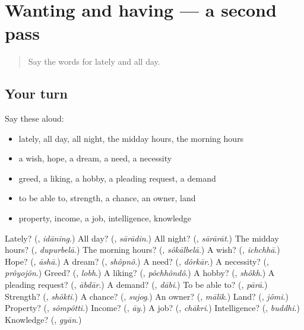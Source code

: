 \section[(dialogue)]{Wanting and having — a second pass}

\label{lesson:BN-R99-second-pass-wanting-and-having}



\begin{quote}
Say the words for lately and all day.
\end{quote}

\subsection*{Your turn}
Say these aloud:

\begin{itemize}
\raggedright
  \item lately, all day, all night, the midday hours, the morning hours
  \item a wish, hope, a dream, a need, a necessity
  \item greed, a liking, a hobby, a pleading request, a demand
  \item to be able to, strength, a chance, an owner, land
  \item property, income, a job, intelligence, knowledge
\end{itemize}

\begin{tcolorbox}[breakable,colback=teal!4,colframe=teal!35!black,title={Before you move on}]
Lately? (\textbf{}, \emph{idānīng}.) All day? (\textbf{}, \emph{sārādin}.) All night? (\textbf{}, \emph{sārārāt}.) The midday hours? (\textbf{}, \emph{dupurbelā}.) The morning hours? (\textbf{}, \emph{sôkālbelā}.) A wish? (\textbf{}, \emph{ichchhā}.) Hope? (\textbf{}, \emph{āshā}.) A dream? (\textbf{}, \emph{shôpnô}.) A need? (\textbf{}, \emph{dôrkār}.) A necessity? (\textbf{}, \emph{prôyojôn}.) Greed? (\textbf{}, \emph{lobh}.) A liking? (\textbf{}, \emph{pôchhôndô}.) A hobby? (\textbf{}, \emph{shôkh}.) A pleading request? (\textbf{}, \emph{ābdār}.) A demand? (\textbf{}, \emph{dābi}.) To be able to? (\textbf{}, \emph{pārā}.) Strength? (\textbf{}, \emph{shôkti}.) A chance? (\textbf{}, \emph{sujog}.) An owner? (\textbf{}, \emph{mālik}.) Land? (\textbf{}, \emph{jômi}.) Property? (\textbf{}, \emph{sômpôtti}.) Income? (\textbf{}, \emph{āy}.) A job? (\textbf{}, \emph{chākri}.) Intelligence? (\textbf{}, \emph{buddhi}.) Knowledge? (\textbf{}, \emph{gyān}.)
\end{tcolorbox}
